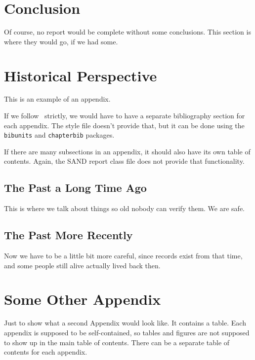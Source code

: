 \documentclass[pdf,ps2pdf,12pt,strict,OUO]{SANDreport}
\begin{document}
	


    \section{Conclusion}
	Of course, no report would be complete without some conclusions.
	This section is where they would go, if we had some.

    \nocite{*}


    \clearpage
    \providecommand*{\phantomsection}{}
    \phantomsection
    
    


    \appendix
    \section{Historical Perspective}
	This is an example of an appendix.

	If we follow~\cite{Sand98-0730} strictly, we would have to
	have a separate bibliography section for each appendix.
	The style file doesn't provide that, but it can be done
	using the {\tt bibunits} and {\tt chapterbib} packages.

	If there are many subsections in an appendix, it should also
	have its own table of contents. Again, the SAND report class
	file does not provide that functionality.

	\subsection{The Past a Long Time Ago}
	    This is where we talk about things so old nobody
	    can verify them. We are safe.

	\subsection{The Past More Recently}
	    Now we have to be a little bit more careful, since
	    records exist from that time, and some people still
	    alive actually lived back then.


    \section{Some Other Appendix}
	Just to show what a second Appendix would look like. It contains
	a table. Each appendix is supposed to be self-contained, so
	tables and figures are not supposed to show up in the main
	table of contents. There can be a separate table of contents
	for each appendix.
\end{document}
